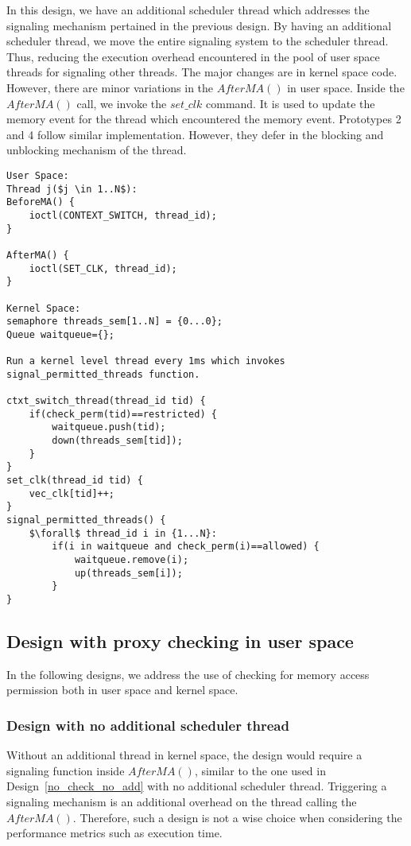 In this design, we have an additional scheduler thread which addresses the signaling mechanism pertained in the previous design. 
By having an additional scheduler thread, we move the entire signaling system to the scheduler thread.
Thus, reducing the execution overhead encountered in the pool of user space threads for signaling other threads.
The major changes are in kernel space code. 
However, there are minor variations in the $AfterMA()$ in user space. 
Inside the $AfterMA()$ call, we invoke the $set\_clk$ command. 
It is used to update the memory event for the thread which encountered the memory event. 
Prototypes 2 and 4 follow similar implementation. 
However, they defer in the blocking and unblocking mechanism of the thread. 
\begin{lstlisting}[mathescape=true,caption={Pseudo Code for Prototype 2}, style=customc,frame=tlrb,label={lst:proto2}]
User Space:
Thread j($j \in 1..N$):
BeforeMA() {	
	ioctl(CONTEXT_SWITCH, thread_id);	
}

AfterMA() {	
	ioctl(SET_CLK, thread_id);
}

Kernel Space:
semaphore threads_sem[1..N] = {0...0};
Queue waitqueue={};

Run a kernel level thread every 1ms which invokes signal_permitted_threads function.

ctxt_switch_thread(thread_id tid) {	
	if(check_perm(tid)==restricted) {
		waitqueue.push(tid);
		down(threads_sem[tid]); 
	}
}
set_clk(thread_id tid) {
	vec_clk[tid]++;
}
signal_permitted_threads() {
	$\forall$ thread_id i in {1...N}:
		if(i in waitqueue and check_perm(i)==allowed) {
			waitqueue.remove(i);
			up(threads_sem[i]);
		}
}
\end{lstlisting}

\subsection{Design with proxy checking in user space\label{proxycheck}}

In the following designs, we address the use of checking for memory access permission both in user space and kernel space.

\subsubsection{Design with no additional scheduler thread}

Without an additional thread in kernel space, the design would require a signaling function inside $AfterMA()$, similar to the one used in Design~\ref{no_check_no_add} with no additional scheduler thread. 
Triggering a signaling mechanism is an additional overhead on the thread calling the $AfterMA()$. 
Therefore, such a design is not a wise choice when considering the performance metrics such as execution time.
 
